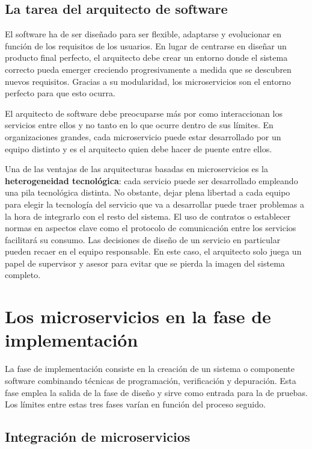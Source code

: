 \documentclass[11pt,spanish,listoffigures,listoftables]{tfgetsinf}
\begin{document}
\subsection{La tarea del arquitecto de software}

El software ha de ser diseñado para ser flexible, adaptarse y evolucionar en función de los requisitos de los usuarios. En lugar de centrarse en diseñar un producto final perfecto, el arquitecto debe crear un entorno donde el sistema correcto pueda emerger creciendo progresivamente a medida que se descubren nuevos requisitos. Gracias a su modularidad, los microservicios son el entorno perfecto para que esto ocurra.

El arquitecto de software debe preocuparse más por como interaccionan los servicios entre ellos y no tanto en lo que ocurre dentro de sus límites. En organizaciones grandes, cada microservicio puede estar desarrollado por un equipo distinto y es el arquitecto quien debe hacer de puente entre ellos. \cite{Newman2015a}

Una de las ventajas de las arquitecturas basadas en microservicios es la \textbf{heterogeneidad tecnológica}: cada servicio puede ser desarrollado empleando una pila tecnológica distinta. No obstante, dejar plena libertad a cada equipo para elegir la tecnología del servicio que va a desarrollar puede traer problemas a la hora de integrarlo con el resto del sistema. El uso de contratos o establecer normas en aspectos clave como el protocolo de comunicación entre los servicios facilitará su consumo. Las decisiones de diseño de un servicio en particular pueden recaer en el equipo responsable. En este caso, el arquitecto solo juega un papel de supervisor y asesor para evitar que se pierda la imagen del sistema completo.

\section{Los microservicios en la fase de implementación}

La fase de implementación consiste en la creación de un sistema o componente software combinando técnicas de programación, verificación y depuración. Esta fase emplea la salida de la fase de diseño y sirve como entrada para la de pruebas. Los límites entre estas tres fases varían en función del proceso seguido. \cite{Bourque2014}

\subsection{Integración de microservicios}
\end{document}
